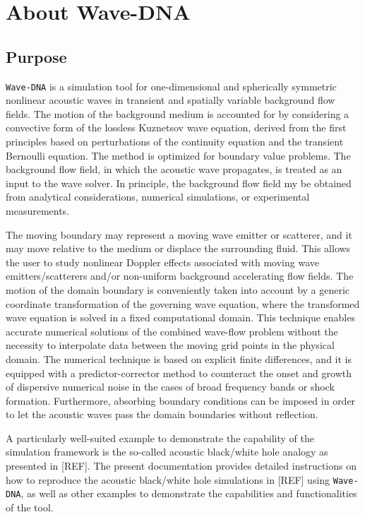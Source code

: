 \chapter{About Wave-DNA}
\label{chap:About Wave-DNA}

\section{Purpose}
\label{sec:Purpose}

{\tt Wave-DNA} is a simulation tool for one-dimensional and spherically symmetric nonlinear acoustic waves in transient and spatially variable background flow fields. The motion of the background medium is accounted for by considering a convective form of the lossless Kuznetsov wave equation, derived from the first principles based on perturbations of the continuity equation and the transient Bernoulli equation. The method is optimized for boundary value problems. The background flow field, in which the acoustic wave propagates, is treated as an input to the wave solver. In principle, the background flow field my be obtained from analytical considerations, numerical simulations, or experimental measurements.

The moving boundary may represent a moving wave emitter or scatterer, and it may move relative to the medium or displace the surrounding fluid. This allows the user to study nonlinear Doppler effects associated with moving wave emitters/scatterers and/or non-uniform background accelerating flow fields. The motion of the domain boundary is conveniently taken into account by a generic coordinate transformation of the governing wave equation, where the transformed wave equation is solved in a fixed computational domain. This technique enables accurate numerical solutions of the combined wave-flow problem without the necessity to interpolate data between the moving grid points in the physical domain. The numerical technique is based on explicit finite differences, and it is equipped with a predictor-corrector method to counteract the onset and growth of dispersive numerical noise in the cases of broad frequency bands or shock formation. Furthermore, absorbing boundary conditions can be imposed in order to let the acoustic waves pass the domain boundaries without reflection.

A particularly well-suited example to demonstrate the capability of the simulation framework is the so-called acoustic black/white hole analogy as presented in [REF]. The present documentation provides detailed instructions on how to reproduce the acoustic black/white hole simulations in [REF] using {\tt Wave-DNA}, as well as other examples to demonstrate the capabilities and functionalities of the tool.

